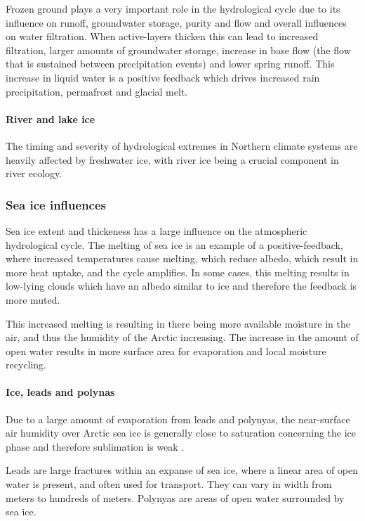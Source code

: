 \documentclass[12pt, oneside]{article}
\begin{document}
Frozen ground plays a very important role in the hydrological cycle due to its influence on runoff, groundwater storage, purity and flow and overall influences on water filtration. When active-layers thicken this can lead to  increased filtration, larger amounts of groundwater storage, increase in base flow (the flow that is sustained between precipitation events) and lower spring runoff. This increase in liquid water is a positive feedback which drives increased rain precipitation, permafrost and glacial melt. 



\paragraph{River and lake ice}
The timing and severity of hydrological extremes in Northern climate systems are heavily affected by freshwater ice, with river ice being a crucial component in river ecology.


\subsubsection{Sea ice influences}
Sea ice extent and thickeness has a large influence on the atmospheric hydrological cycle. The melting of sea ice is an example of a positive-feedback, where increased temperatures cause melting, which reduce albedo, which result in more heat uptake, and the cycle amplifies. In some cases, this melting results in low-lying clouds which have an albedo similar to ice and therefore the feedback is more muted. 

This increased melting is resulting in there being more available moisture in the air, and thus the humidity of the Arctic increasing. The increase in the amount of open water results in more surface area for evaporation and local moisture recycling. 

\paragraph{Ice, leads and polynas}
 Due to a large amount of evaporation from leads and polynyas, the near-surface air humidity over Arctic sea ice is generally close to saturation concerning the ice phase and therefore sublimation is weak \cite{andreas2002near}. 
 
 Leads are large fractures within an expanse of sea ice, where a linear area of open water is present, and often used for transport. They can vary in width from meters to hundreds of meters. Polynyas are areas of open water surrounded by sea ice.
\end{document}
